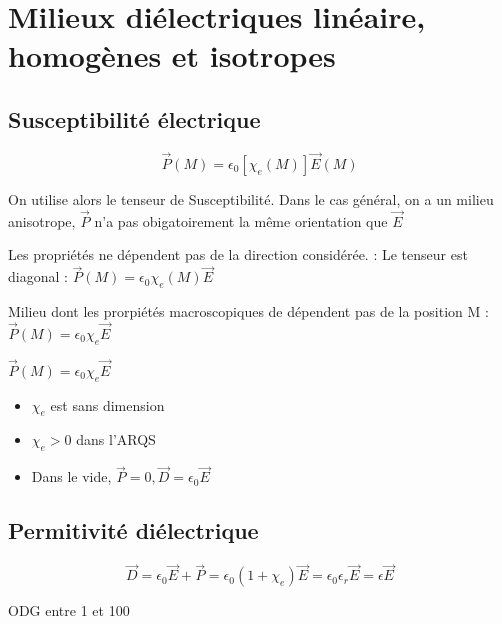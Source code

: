 \documentclass[french]{yLectureNote}
\renewcommand{\vec}{\overrightarrow}
\begin{document}
\section{Milieux diélectriques linéaire, homogènes et isotropes}
\subsection{Susceptibilité électrique}
\begin{definition}
    $$\vec{P}(M) = \epsilon_0 [\chi_e(M)]\vec{E}(M)$$
\end{definition}
On utilise alors le tenseur de Susceptibilité. Dans le cas général, on a un milieu anisotrope, $\vec{P}$ n'a pas obigatoirement la m\^eme orientation que $\vec{E}$
\begin{definition}[Isotrope]
    Les propriétés ne dépendent pas de la direction considérée. : Le tenseur est diagonal : $\vec{P}(M) = \epsilon_0 \chi_e(M)\vec{E}$
\end{definition}
\begin{definition}
    Milieu dont les prorpiétés macroscopiques de dépendent pas de la position M : $\vec{P}(M) = \epsilon_0 \chi_e\vec{E}$
\end{definition}
\begin{theorem}
    $\vec{P}(M) = \epsilon_0 \chi_e\vec{E}$
\end{theorem}
\begin{itemize}
    \item $\chi_e$ est sans dimension
    \item $\chi_e>0$ dans l'ARQS 
    \item Dans le vide, $\vec{P} = 0, \vec{D} = \epsilon_0\vec{E}$
\end{itemize}
\subsection{Permitivité diélectrique}
\begin{theorem}
    $$\vec{D} = \epsilon_0 \vec{E} + \vec{P} = \epsilon_0 (1+\chi_e)\vec{E} = \epsilon_0\epsilon_r \vec{E} = \epsilon \vec{E}$$
\end{theorem}
ODG entre 1 et 100
\end{document}
